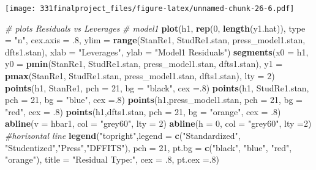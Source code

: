 \documentclass[]{article}
\newenvironment{Shaded}{\begin{snugshade}}{\end{snugshade}}
\newcommand{\KeywordTok}[1]{\textcolor[rgb]{0.13,0.29,0.53}{\textbf{#1}}}
\newcommand{\DataTypeTok}[1]{\textcolor[rgb]{0.13,0.29,0.53}{#1}}
\newcommand{\DecValTok}[1]{\textcolor[rgb]{0.00,0.00,0.81}{#1}}
\newcommand{\StringTok}[1]{\textcolor[rgb]{0.31,0.60,0.02}{#1}}
\newcommand{\CommentTok}[1]{\textcolor[rgb]{0.56,0.35,0.01}{\textit{#1}}}
\newcommand{\NormalTok}[1]{#1}
\begin{document}
\texttt{[image: 331finalproject\_files/figure-latex/unnamed-chunk-26-6.pdf]}

\begin{Shaded}
\begin{Highlighting}[]
\CommentTok{# plots Residuals vs Leverages}
\CommentTok{# model1}
\KeywordTok{plot}\NormalTok{(h1, }\KeywordTok{rep}\NormalTok{(}\DecValTok{0}\NormalTok{, }\KeywordTok{length}\NormalTok{(y1.hat)), }\DataTypeTok{type =} \StringTok{"n"}\NormalTok{, }\DataTypeTok{cex.axis =}\NormalTok{ .}\DecValTok{8}\NormalTok{, }
     \DataTypeTok{ylim =} \KeywordTok{range}\NormalTok{(StanRe1, StudRe1.stan, press_model1.stan, dfts1.stan),}
     \DataTypeTok{xlab =} \StringTok{"Leverages"}\NormalTok{, }\DataTypeTok{ylab =} \StringTok{"Model1 Residuals"}\NormalTok{)}
\KeywordTok{segments}\NormalTok{(}\DataTypeTok{x0 =}\NormalTok{ h1,}
        \DataTypeTok{y0 =} \KeywordTok{pmin}\NormalTok{(StanRe1, StudRe1.stan, press_model1.stan, dfts1.stan),}
        \DataTypeTok{y1 =} \KeywordTok{pmax}\NormalTok{(StanRe1, StudRe1.stan, press_model1.stan, dfts1.stan),}
        \DataTypeTok{lty =} \DecValTok{2}\NormalTok{)}
\KeywordTok{points}\NormalTok{(h1, StanRe1, }\DataTypeTok{pch =} \DecValTok{21}\NormalTok{, }\DataTypeTok{bg =} \StringTok{"black"}\NormalTok{, }\DataTypeTok{cex =}\NormalTok{.}\DecValTok{8}\NormalTok{)}
\KeywordTok{points}\NormalTok{(h1, StudRe1.stan, }\DataTypeTok{pch =} \DecValTok{21}\NormalTok{, }\DataTypeTok{bg =} \StringTok{"blue"}\NormalTok{, }\DataTypeTok{cex =}\NormalTok{.}\DecValTok{8}\NormalTok{)}
\KeywordTok{points}\NormalTok{(h1,press_model1.stan, }\DataTypeTok{pch =} \DecValTok{21}\NormalTok{, }\DataTypeTok{bg =} \StringTok{"red"}\NormalTok{, }\DataTypeTok{cex =}\NormalTok{ .}\DecValTok{8}\NormalTok{)}
\KeywordTok{points}\NormalTok{(h1,dfts1.stan, }\DataTypeTok{pch =} \DecValTok{21}\NormalTok{, }\DataTypeTok{bg =} \StringTok{"orange"}\NormalTok{, }\DataTypeTok{cex =}\NormalTok{ .}\DecValTok{8}\NormalTok{)}
\KeywordTok{abline}\NormalTok{(}\DataTypeTok{v =}\NormalTok{ hbar1, }\DataTypeTok{col =} \StringTok{"grey60"}\NormalTok{, }\DataTypeTok{lty =} \DecValTok{2}\NormalTok{)}
\KeywordTok{abline}\NormalTok{(}\DataTypeTok{h =} \DecValTok{0}\NormalTok{, }\DataTypeTok{col =} \StringTok{"grey60"}\NormalTok{, }\DataTypeTok{lty =}\DecValTok{2}\NormalTok{) }\CommentTok{#horizontal line}
\KeywordTok{legend}\NormalTok{(}\StringTok{"topright"}\NormalTok{,}\DataTypeTok{legend =} \KeywordTok{c}\NormalTok{(}\StringTok{"Standardized"}\NormalTok{, }\StringTok{"Studentized"}\NormalTok{,}\StringTok{"Press"}\NormalTok{,}\StringTok{"DFFITS"}\NormalTok{), }\DataTypeTok{pch =} \DecValTok{21}\NormalTok{, }\DataTypeTok{pt.bg =} \KeywordTok{c}\NormalTok{(}\StringTok{"black"}\NormalTok{, }\StringTok{"blue"}\NormalTok{, }\StringTok{"red"}\NormalTok{, }\StringTok{"orange"}\NormalTok{), }\DataTypeTok{title =} \StringTok{"Residual Type:"}\NormalTok{, }\DataTypeTok{cex =}\NormalTok{ .}\DecValTok{8}\NormalTok{, }\DataTypeTok{pt.cex =}\NormalTok{.}\DecValTok{8}\NormalTok{)}


\end{Highlighting}
\end{Shaded}
\end{document}
